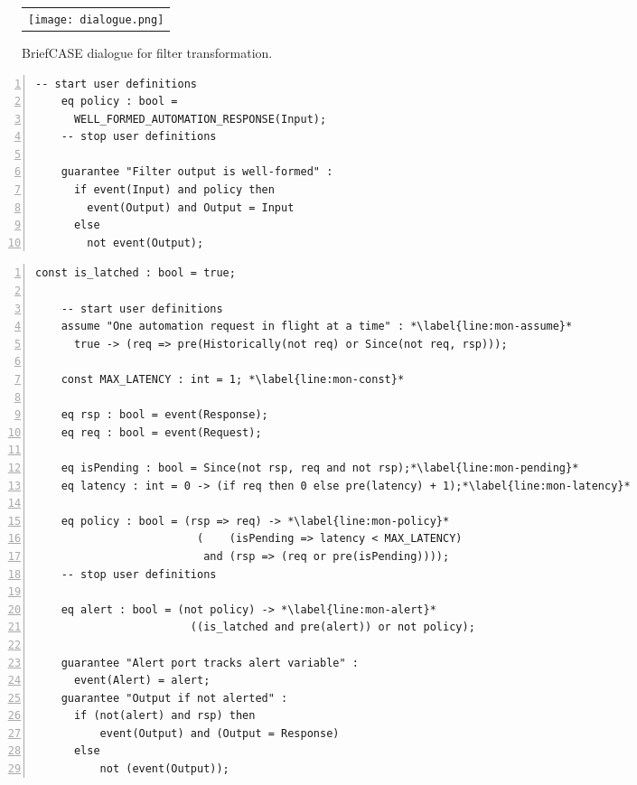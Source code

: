 \begin{figure}
  \begin{center}
    \begin{tabular}{c}
    \texttt{[image: dialogue.png]}
    \end{tabular}
  \end{center}
  \caption{BriefCASE dialogue for filter transformation.}
  \label{fig:dialogue}
\end{figure}

\newsavebox{\flt}
\begin{lrbox}{\flt}
  \begin{lstlisting}[style=agree,numbers=left]
    -- start user definitions
    eq policy : bool = 
      WELL_FORMED_AUTOMATION_RESPONSE(Input);
    -- stop user definitions

    guarantee "Filter output is well-formed" :
      if event(Input) and policy then 
        event(Output) and Output = Input
      else 
        not event(Output);
  \end{lstlisting}
\end{lrbox}

\newsavebox{\mntr}
\begin{lrbox}{\mntr}
  \begin{lstlisting}[style=agree,numbers=left]
    const is_latched : bool = true;

    -- start user definitions
    assume "One automation request in flight at a time" : *\label{line:mon-assume}*
      true -> (req => pre(Historically(not req) or Since(not req, rsp)));

    const MAX_LATENCY : int = 1; *\label{line:mon-const}*
        
    eq rsp : bool = event(Response);
    eq req : bool = event(Request);

    eq isPending : bool = Since(not rsp, req and not rsp);*\label{line:mon-pending}*
    eq latency : int = 0 -> (if req then 0 else pre(latency) + 1);*\label{line:mon-latency}*
    
    eq policy : bool = (rsp => req) -> *\label{line:mon-policy}*
                         (    (isPending => latency < MAX_LATENCY)   
                          and (rsp => (req or pre(isPending))));
    -- stop user definitions
    
    eq alert : bool = (not policy) -> *\label{line:mon-alert}*
                        ((is_latched and pre(alert)) or not policy);
                          
    guarantee "Alert port tracks alert variable" :
      event(Alert) = alert;
    guarantee "Output if not alerted" :
      if (not(alert) and rsp) then
          event(Output) and (Output = Response)
      else
          not (event(Output));    
  \end{lstlisting}
\end{lrbox}

